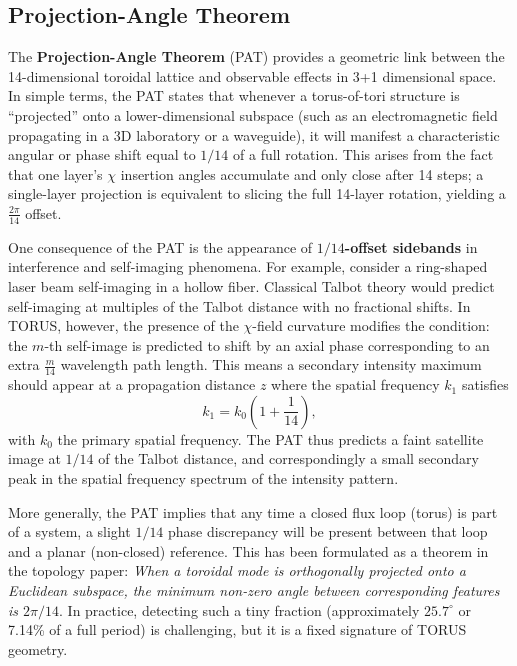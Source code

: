 \documentclass{article}
\begin{document}
\subsection{Projection-Angle Theorem}
The \textbf{Projection-Angle Theorem} (PAT) provides a geometric link between the 14-dimensional toroidal lattice and observable effects in 3+1 dimensional space. In simple terms, the PAT states that whenever a torus-of-tori structure is ``projected'' onto a lower-dimensional subspace (such as an electromagnetic field propagating in a 3D laboratory or a waveguide), it will manifest a characteristic angular or phase shift equal to $1/14$ of a full rotation. This arises from the fact that one layer's $\chi$ insertion angles accumulate and only close after 14 steps; a single-layer projection is equivalent to slicing the full 14-layer rotation, yielding a $\frac{2\pi}{14}$ offset.

One consequence of the PAT is the appearance of \textbf{$1/14$-offset sidebands} in interference and self-imaging phenomena. For example, consider a ring-shaped laser beam self-imaging in a hollow fiber. Classical Talbot theory would predict self-imaging at multiples of the Talbot distance with no fractional shifts. In TORUS, however, the presence of the $\chi$-field curvature modifies the condition: the $m$-th self-image is predicted to shift by an axial phase corresponding to an extra $\frac{m}{14}$ wavelength path length. This means a secondary intensity maximum should appear at a propagation distance $z$ where the spatial frequency $k_1$ satisfies 
\[ k_1 = k_0 \left(1 + \frac{1}{14}\right), \] 
with $k_0$ the primary spatial frequency. The PAT thus predicts a faint satellite image at $1/14$ of the Talbot distance, and correspondingly a small secondary peak in the spatial frequency spectrum of the intensity pattern.

More generally, the PAT implies that any time a closed flux loop (torus) is part of a system, a slight $1/14$ phase discrepancy will be present between that loop and a planar (non-closed) reference. This has been formulated as a theorem in the topology paper: \emph{When a toroidal mode is orthogonally projected onto a Euclidean subspace, the minimum non-zero angle between corresponding features is $2\pi/14$}. In practice, detecting such a tiny fraction (approximately $25.7^\circ$ or 7.14\% of a full period) is challenging, but it is a fixed signature of TORUS geometry.
\end{document}
